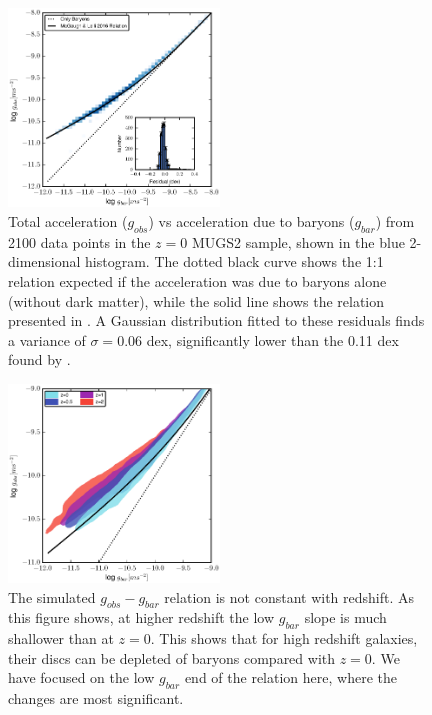 \begin{figure}
    \includegraphics[width=0.5\textwidth]{figures4/SPARC_plot.eps}
    \caption{Total acceleration ($g_{obs}$) vs acceleration due to baryons
    ($g_{bar}$) from 2100 data points in the $z=0$ MUGS2 sample, shown in the
    blue 2-dimensional histogram.  The dotted black curve shows the 1:1 relation
    expected if the acceleration was due to baryons alone (without dark matter),
    while the solid line shows the relation presented in \citet{McGaugh2016}.
    A Gaussian distribution fitted to these residuals finds a
    variance of $\sigma=0.06$ dex, significantly lower than the 0.11 dex found
    by \citet{McGaugh2016}.} \label{SPARC_plot}
\end{figure}
\begin{figure}
    \includegraphics[width=0.5\textwidth]{figures4/redshift_evolution.eps}
    \caption{The  simulated $g_{obs}-g_{bar}$ relation is not constant with
    redshift.  As this figure shows, at higher redshift the low $g_{bar}$ slope
    is much shallower than at $z=0$.  This shows that for high redshift
    galaxies, their discs can be depleted of baryons compared with $z=0$.  We
    have focused on the low $g_{bar}$ end of the relation here, where the
    changes are most significant.}
    \label{redshift_evolution}
\end{figure}
